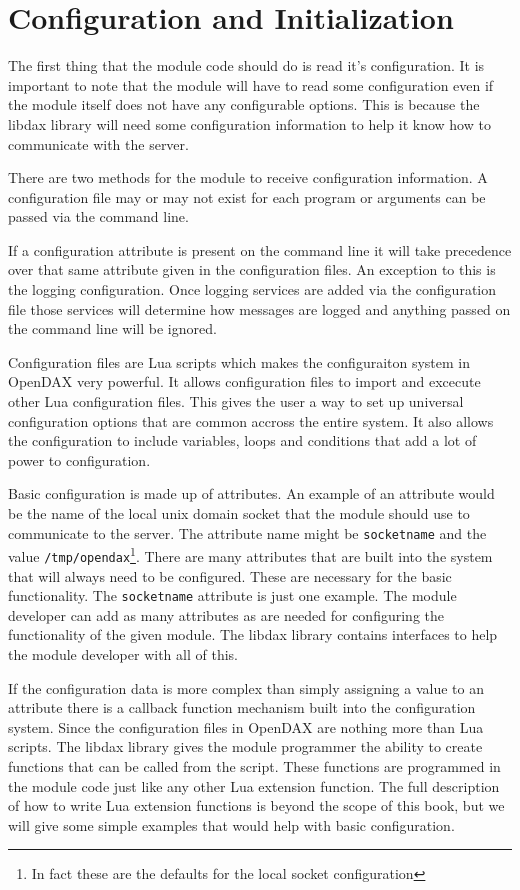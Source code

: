\chapter{Configuration and Initialization}

The first thing that the module code should do is read it's configuration.  It
is important to note that the module will have to read some configuration even
if the module itself does not have any configurable options. This is because the
libdax library will need some configuration information to help it know how to
communicate with the server.

There are two methods for the module to receive configuration information.
A configuration file may or may not exist for each program or arguments can
be passed via the command line.

If a configuration
attribute is present on the command line it will take precedence over that same
attribute given in the configuration files.  An exception to this is the logging
configuration.  Once logging services are added via the configuration file those
services will determine how messages are logged and anything passed on the 
command line will be ignored.

Configuration files are Lua scripts which makes the configuraiton system in
OpenDAX very powerful.  It allows configuration files to import and excecute 
other Lua configuration files.  This gives the user a way to set up universal 
configuration options that are common accross the entire system.  It also allows
the configuration to include variables, loops and conditions that add a lot
of power to configuration.

Basic configuration is made up of attributes.  An example of an attribute would be the
name of the local unix domain socket that the module should use to communicate
to the server.  The attribute name might be \texttt{socketname} and the value
\texttt{/tmp/opendax}\footnote{In fact these are the defaults for the local
socket configuration}.  There are many attributes that are built into the system
that will always need to be configured.  These are necessary for the basic
functionality.  The \texttt{socketname} attribute is just one example.  The
module developer can add as many attributes as are needed for configuring the
functionality of the given module.  The libdax library contains interfaces to
help the module developer with all of this.

If the configuration data is more complex than simply assigning a value to an
attribute there is a callback function mechanism built into the configuration
system.  Since the configuration files in OpenDAX are nothing more than Lua scripts.
The libdax library gives the module programmer the ability to create functions
that can be called from the script.  These functions are programmed in the
module code just like any other Lua extension function.  The full description of
how to write Lua extension functions is beyond the scope of this book, but we
will give some simple examples that would help with basic configuration.


